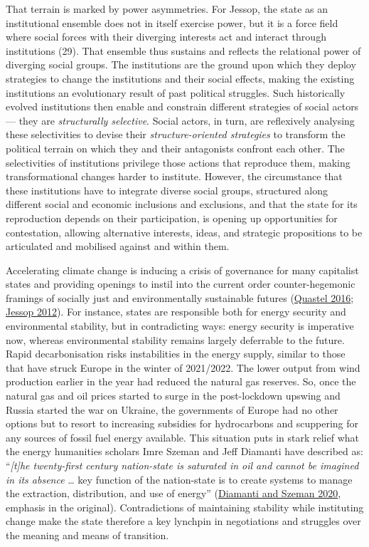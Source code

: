 \documentclass[a4paper, nobind]{templates/ociamthesis}
\begin{document}
That terrain is marked by power asymmetries. For Jessop, the state as an institutional ensemble does not in itself exercise power, but it is a force field where social forces with their diverging interests act and interact through institutions (29). That ensemble thus sustains and reflects the relational power of diverging social groups. The institutions are the ground upon which they deploy strategies to change the institutions and their social effects, making the existing institutions an evolutionary result of past political struggles. Such historically evolved institutions then enable and constrain different strategies of social actors --- they are \emph{structurally selective}. Social actors, in turn, are reflexively analysing these selectivities to devise their \emph{structure-oriented strategies} to transform the political terrain on which they and their antagonists confront each other. The selectivities of institutions privilege those actions that reproduce them, making transformational changes harder to institute. However, the circumstance that these institutions have to integrate diverse social groups, structured along different social and economic inclusions and exclusions, and that the state for its reproduction depends on their participation, is opening up opportunities for contestation, allowing alternative interests, ideas, and strategic propositions to be articulated and mobilised against and within them.

Accelerating climate change is inducing a crisis of governance for many capitalist states and providing openings to instil into the current order counter-hegemonic framings of socially just and environmentally sustainable futures (\protect\hyperlink{ref-quastel_ecological_2016}{Quastel 2016}; \protect\hyperlink{ref-jessop_economic_2012}{Jessop 2012}). For instance, states are responsible both for energy security and environmental stability, but in contradicting ways: energy security is imperative now, whereas environmental stability remains largely deferrable to the future. Rapid decarbonisation risks instabilities in the energy supply, similar to those that have struck Europe in the winter of 2021/2022. The lower output from wind production earlier in the year had reduced the natural gas reserves. So, once the natural gas and oil prices started to surge in the post-lockdown upswing and Russia started the war on Ukraine, the governments of Europe had no other options but to resort to increasing subsidies for hydrocarbons and scuppering for any sources of fossil fuel energy available. This situation puts in stark relief what the energy humanities scholars Imre Szeman and Jeff Diamanti have described as: ``\emph{{[}t{]}he twenty-first century nation-state is saturated in oil and cannot be imagined in its absence} \ldots{} key function of the nation-state is to create systems to manage the extraction, distribution, and use of energy'' (\protect\hyperlink{ref-diamanti_nine_2020}{Diamanti and Szeman 2020}, emphasis in the original). Contradictions of maintaining stability while instituting change make the state therefore a key lynchpin in negotiations and struggles over the meaning and means of transition.
\end{document}
